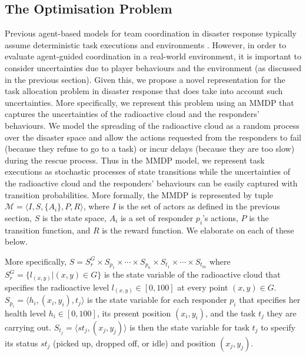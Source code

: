 \subsection{The Optimisation Problem}
\label{sec:model}
\noindent Previous agent-based models for team coordination in disaster response typically assume deterministic task executions and environments \cite{ramchurn:etal:2010,Scerri2005}. However, in order to evaluate agent-guided coordination in a real-world environment, it is important to consider uncertainties due to player behaviours and the environment (as discussed in the previous section). Given this, we propose a novel representation for the task allocation problem in disaster response that does take into account such uncertainties. More specifically, we represent this problem using an MMDP that captures the uncertainties of the radioactive cloud and the responders' behaviours. We model the spreading of the radioactive cloud as a random process over the disaster space and allow the actions requested from the responders to  fail (because they refuse to go to a  task) or incur delays (because they are too slow) during the rescue process. Thus in the MMDP model, we represent  task executions as stochastic processes of state transitions while the uncertainties of the radioactive cloud and the responders' behaviours can be easily captured with transition probabilities.  More formally, the MMDP is
represented by tuple $\mathcal{M} = \langle I, S, \{A_i\}, P, R
\rangle$, where $I$ is the set of actors as defined in the previous
section,  $S$ is the state space, $A_i$ is a set of responder
$p_i$'s actions, $P$ is the transition function, and $R$ is the
reward function. We elaborate on each of these below.

More specifically, $S= S^G_r \times S_{p_1} \times \cdots \times
S_{p_n} \times S_{t_1} \times \cdots \times S_{t_m}$ where $S^G_r =
\{l_{(x,y)}| (x, y) \in G\}$ is the state variable of the
radioactive cloud that specifies the radioactive level
$l_{(x,y)}\in[0, 100]$ at every point $(x, y)\in G$. $S_{p_i} =
\langle h_i, (x_i, y_i), t_j \rangle$ is the state variable for
each responder $p_i$ that specifies her health level
$h_i\in[0, 100]$, its present position $(x_i, y_i)$, and the task
$t_j$ they are carrying out. $S_{t_j} = \langle st_j, (x_j, y_j)
\rangle$ is then the state variable for task $t_j$ to specify its
status $st_j$ (picked up, dropped off, or idle) and position $(x_j,
y_j)$.

